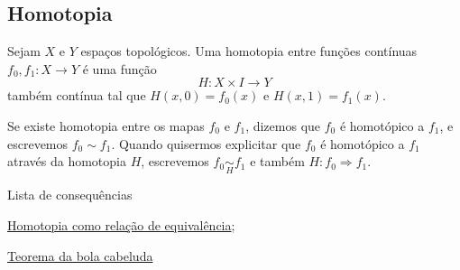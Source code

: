 \subsection{Homotopia}
\label{homotopia-def}
\begin{defi}[Homotopia]
	Sejam $X$ e $Y$ espaços topológicos. Uma homotopia entre funções contínuas $f_0, f_1: X\rightarrow Y$ é uma função $$H:X\times I\rightarrow Y$$ também contínua tal que $H(x,0)=f_0(x)$ e $H(x,1)=f_1(x)$.
\end{defi}

Se existe homotopia entre os mapas $f_0$ e $f_1$, dizemos que $f_0$ é homotópico a $f_1$, e escrevemos $f_0\sim f_1$. Quando quisermos explicitar que $f_0$ é homotópico a $f_1$ através da homotopia $H$, escrevemos $f_0 \underset{H}{\sim} f_1$ e também $H:f_0\Rightarrow f_1$.

\begin{titlemize}{Lista de consequências}
	\item \hyperref[homotopia-relaçao-de-equivalencia-prop]{Homotopia como relação de equivalência};\\ %
	\item \hyperref[homotopia-teorema-da-bola-cabeluda]{Teorema da bola cabeluda}
\end{titlemize}

